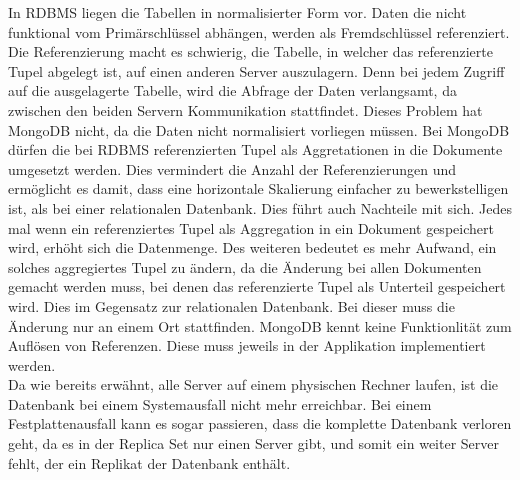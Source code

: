  In RDBMS liegen die Tabellen in normalisierter Form vor. Daten die nicht
 funktional vom Primärschlüssel abhängen, werden als Fremdschlüssel
 referenziert. Die Referenzierung macht es schwierig, die Tabelle, in
 welcher das referenzierte Tupel abgelegt ist, auf einen anderen Server
 auszulagern. Denn bei jedem Zugriff auf die ausgelagerte Tabelle, wird die
 Abfrage der Daten verlangsamt, da zwischen den beiden Servern Kommunikation
 stattfindet. Dieses Problem hat MongoDB nicht, da die Daten nicht normalisiert
 vorliegen müssen. Bei MongoDB dürfen die bei RDBMS referenzierten Tupel als
 Aggretationen in die Dokumente umgesetzt werden. Dies vermindert die Anzahl der
 Referenzierungen und ermöglicht es damit, dass eine horizontale Skalierung
 einfacher zu bewerkstelligen ist, als bei einer relationalen Datenbank. Dies
 führt auch Nachteile mit sich. Jedes mal wenn ein referenziertes
 Tupel als Aggregation in ein Dokument gespeichert wird, erhöht sich die
 Datenmenge. Des weiteren bedeutet es mehr Aufwand, ein solches aggregiertes
 Tupel zu ändern, da die Änderung bei allen Dokumenten gemacht werden muss, bei denen
 das referenzierte Tupel als Unterteil gespeichert wird. Dies im Gegensatz zur
 relationalen Datenbank. Bei dieser muss die Änderung nur an einem Ort
 stattfinden. MongoDB kennt keine Funktionlität zum Auflösen von Referenzen.
 Diese muss jeweils in der Applikation implementiert werden. \\
 Da wie bereits erwähnt, alle Server auf einem physischen Rechner
 laufen, ist die Datenbank bei einem Systemausfall nicht mehr erreichbar.
Bei einem Festplattenausfall kann es sogar passieren, dass die komplette
Datenbank verloren geht, da es in der Replica Set nur einen Server gibt, und
somit ein weiter Server fehlt, der ein Replikat der Datenbank enthält.
 